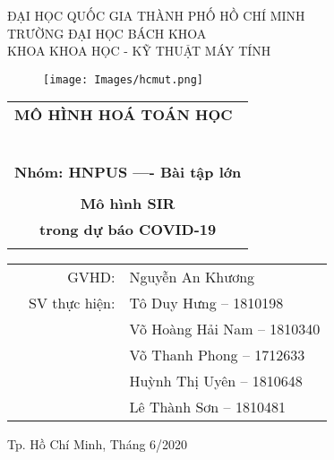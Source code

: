 \documentclass[a4paper]{article}
\begin{document}
\begin{titlepage}
\begin{center}
ĐẠI HỌC QUỐC GIA THÀNH PHỐ HỒ CHÍ MINH \\
TRƯỜNG ĐẠI HỌC BÁCH KHOA \\
KHOA KHOA HỌC - KỸ THUẬT MÁY TÍNH 
\end{center}

\vspace{1cm}

\begin{figure}[h!]
\begin{center}
\texttt{[image: Images/hcmut.png]}
\end{center}
\end{figure}

\vspace{1cm}


\begin{center}
\begin{tabular}{c}
\multicolumn{1}{l}{\textbf{{\Large MÔ HÌNH HOÁ TOÁN HỌC}}}\\
~~\\
\hline
\\
\multicolumn{1}{l}{\textbf{{\Large Nhóm: HNPUS ---- Bài tập lớn}}}\\
\\
\textbf{{\Huge Mô hình SIR}} \\
\textbf{{\Huge trong dự báo COVID-19}}\\
\\
\hline
\end{tabular}
\end{center}

\vspace{1.5cm}

\begin{table}[h]
\begin{tabular}{rrl}
\hspace{5 cm} & GVHD: & Nguyễn An Khương\\

& SV thực hiện: & Tô Duy Hưng -- 1810198 \\
& & Võ Hoàng Hải Nam -- 1810340 \\
& & Võ Thanh Phong -- 1712633 \\
& & Huỳnh Thị Uyên -- 1810648 \\
& & Lê Thành Sơn -- 1810481 \\
\end{tabular}
\end{table}
\vspace{1.5cm}
\begin{center}
{\footnotesize Tp. Hồ Chí Minh, Tháng 6/2020}
\end{center}
\end{titlepage}
\end{document}
